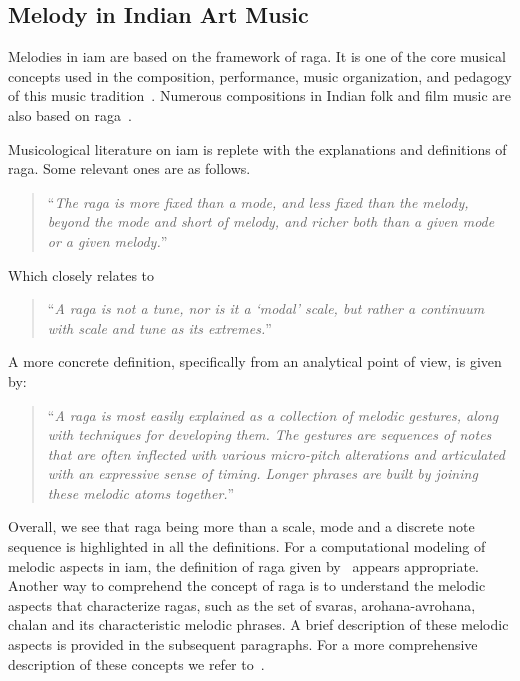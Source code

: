 \subsection{Melody in Indian Art Music}
\label{sec:melody_in_iam}

Melodies in \gls{iam} are based on the framework of \gls{raga}. It is one of the core musical concepts used in the composition, performance, music organization, and pedagogy of this music tradition~\citep{Bagchee1998,Danielou2010}. Numerous compositions in Indian folk and film music are also based on \gls{raga}~\citep{ganti2013bollywood}.

Musicological literature on \gls{iam} is replete with the explanations and definitions of \gls{raga}. Some relevant ones are as follows.

\blockcquote[p. 96]{martinez2001semiosis}{``\textit{The \gls{raga} is more fixed than a mode, and less fixed than the melody, beyond the mode and short of melody, and richer both than a given mode or a given melody.}''}

Which closely relates to

\blockcquote[]{powers1963background}{``\textit{A \gls{raga} is not a tune, nor is it a `modal' scale, but rather a continuum with scale and tune as its extremes.}''}

A more concrete definition, specifically from an analytical point of view, is given by:

\blockcquote[]{chordia2013joint}{``\textit{A \gls{raga} is most easily explained as a collection of melodic gestures, along with techniques for developing them. The gestures are sequences of notes that are often inflected with various micro-pitch alterations and articulated with an expressive sense of timing. Longer phrases are built by joining these melodic atoms together.}''}

Overall, we see that \gls{raga} being more than a scale, mode and a discrete note sequence is highlighted in all the definitions. For a computational modeling of melodic aspects in \gls{iam}, the definition of \gls{raga} given by~\cite{chordia2013joint} appears appropriate. Another way to comprehend the concept of \gls{raga} is to understand the melodic aspects that characterize \glspl{raga}, such as the set of \glspl{svara}, \gls{arohana}-\gls{avrohana}, \gls{chalan} and its characteristic melodic phrases. A brief description of these melodic aspects is provided in the subsequent paragraphs. For a more comprehensive description of these concepts we refer to~\cite{Danielou2010,Bagchee1998,Viswanathan2004}.


